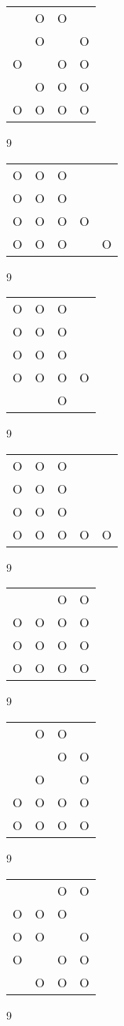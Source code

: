 \begin{tabular}{|m{0.2cm}m{0.2cm}m{0.2cm}m{0.2cm}|}\hline
 &O&O& \\
 &O& &O\\
O& &O&O\\
 &O&O&O\\
O&O&O&O\\
\hline\end{tabular}9
\begin{tabular}{|m{0.2cm}m{0.2cm}m{0.2cm}m{0.2cm}m{0.2cm}|}\hline
O&O&O& & \\
O&O&O& & \\
O&O&O&O& \\
O&O&O& &O\\
\hline\end{tabular}9
\begin{tabular}{|m{0.2cm}m{0.2cm}m{0.2cm}m{0.2cm}|}\hline
O&O&O& \\
O&O&O& \\
O&O&O& \\
O&O&O&O\\
 & &O& \\
\hline\end{tabular}9
\begin{tabular}{|m{0.2cm}m{0.2cm}m{0.2cm}m{0.2cm}m{0.2cm}|}\hline
O&O&O& & \\
O&O&O& & \\
O&O&O& & \\
O&O&O&O&O\\
\hline\end{tabular}9
\begin{tabular}{|m{0.2cm}m{0.2cm}m{0.2cm}m{0.2cm}|}\hline
 & &O&O\\
O&O&O&O\\
O&O&O&O\\
O&O&O&O\\
\hline\end{tabular}9
\begin{tabular}{|m{0.2cm}m{0.2cm}m{0.2cm}m{0.2cm}|}\hline
 &O&O& \\
 & &O&O\\
 &O& &O\\
O&O&O&O\\
O&O&O&O\\
\hline\end{tabular}9
\begin{tabular}{|m{0.2cm}m{0.2cm}m{0.2cm}m{0.2cm}|}\hline
 & &O&O\\
O&O&O& \\
O&O& &O\\
O& &O&O\\
 &O&O&O\\
\hline\end{tabular}9
